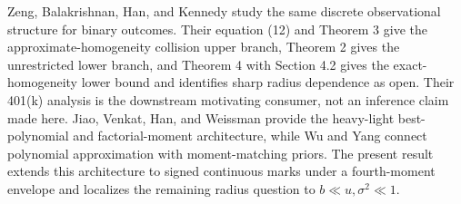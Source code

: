 Zeng, Balakrishnan, Han, and Kennedy study the same discrete observational structure for binary outcomes.  Their equation (12) and Theorem 3 give the approximate-homogeneity collision upper branch, Theorem 2 gives the unrestricted lower branch, and Theorem 4 with Section 4.2 gives the exact-homogeneity lower bound and identifies sharp radius dependence as open.  Their 401(k) analysis is the downstream motivating consumer, not an inference claim made here.  Jiao, Venkat, Han, and Weissman provide the heavy-light best-polynomial and factorial-moment architecture, while Wu and Yang connect polynomial approximation with moment-matching priors.  The present result extends this architecture to signed continuous marks under a fourth-moment envelope and localizes the remaining radius question to \(b\ll u,\sigma^2\ll1\).